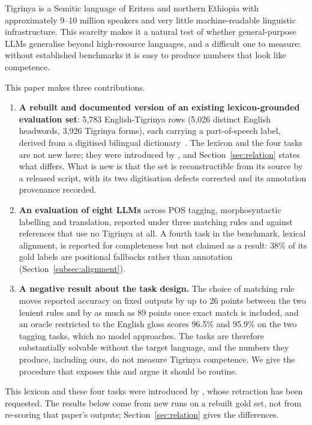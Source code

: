 \documentclass[11pt]{article}
\begin{document}
Tigrinya is a Semitic language of Eritrea and northern Ethiopia with
approximately 9--10 million speakers and very little machine-readable
linguistic infrastructure. This scarcity makes it a natural test of whether general-purpose LLMs generalise beyond high-resource languages, and a
difficult one to measure: without established benchmarks it is easy to
produce numbers that look like competence.

This paper makes three contributions.

\begin{enumerate}
  \item \textbf{A rebuilt and documented version of an existing
    lexicon-grounded evaluation set}: 5,783 English-Tigrinya rows (5,026
    distinct English headwords, 3,926 Tigrinya forms), each carrying a
    part-of-speech label, derived from a digitised bilingual
    dictionary~\citep{swansea-dictionary}. The lexicon and the four tasks
    are not new here; they were introduced by \citet{llmprobe-2026}, and
    Section~\ref{sec:relation} states what differs. What is new is that the
    set is reconstructible from its source by a released script, with its
    two digitisation defects corrected and its annotation provenance
    recorded.
  \item \textbf{An evaluation of eight LLMs} across POS tagging,
    morphosyntactic labelling and translation, reported under three matching
    rules and against references that use no Tigrinya at all. A fourth task
    in the benchmark, lexical alignment, is reported for completeness but not
    claimed as a result: 38\% of its gold labels are positional fallbacks
    rather than annotation (Section~\ref{subsec:alignment}).
  \item \textbf{A negative result about the task design.} The choice of
    matching rule moves reported accuracy on fixed outputs by up to 26 points
    between the two lenient rules and by as much as 89 points once exact
    match is included, and an oracle restricted to the English gloss scores
    96.5\% and 95.9\% on the two tagging tasks, which no model approaches.
    The tasks are therefore substantially solvable without the target
    language, and the numbers they produce, including ours, do not measure
    Tigrinya competence. We give the procedure that exposes this and argue it
    should be routine.
\end{enumerate}

This lexicon and these four tasks were introduced by
\citet{llmprobe-2026}, whose retraction has been requested. The results below come from new runs on a rebuilt gold set, not from re-scoring that paper's outputs; Section~\ref{sec:relation} gives the differences.
\end{document}

